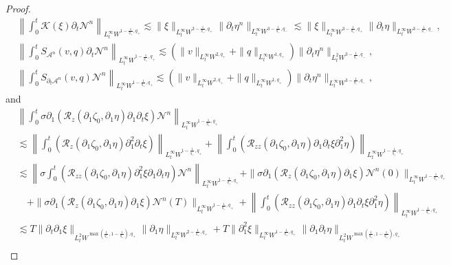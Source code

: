 \documentclass[letterpaper,reqno,10pt,twoside]{amsart}
\theoremstyle{definition}
\theoremstyle{remark}
\def\p{\partial}
\begin{document}
\begin{proof}
		\[
		\begin{aligned}
			& \left \|\int_{0}^{t}\mathcal{K}(\xi)\p_{t}\mathcal{N}^{n} \right\|_{L_{t}^{\infty}W^{1-\frac{1}{q_{+}},q_{+}}}\lesssim \|\xi\|_{L_{t}^{\infty}W^{3-\frac{1}{q_{+}},q_{+}}}\|\p_{t}\eta^{n}\|_{L_{t}^{\infty}W^{3-\frac{1}{q_{-}},q_{-}}}\lesssim \|\xi\|_{L_{t}^{\infty}W^{3-\frac{1}{q_{+}},q_{+}}}\|\p_{t}\eta\|_{L_{t}^{\infty}W^{3-\frac{1}{q_{-}},q_{-}}},\\
			& \left \|\int_{0}^{t}S_{\mathcal{A}^{n}}(v,q)\p_{t}\mathcal{N}^{n} \right\|_{L_{t}^{\infty}W^{1-\frac{1}{q_{+}},q_{+}}}\lesssim (\|v\|_{L_{t}^{\infty}W^{2,q_{+}}}+\|q\|_{L_{t}^{\infty}W^{1,q_{+}}})\|\p_{t}\eta^{n}\|_{L_{t}^{2}W^{3-\frac{1}{q_{-}},q_{-}}},\\
			& \left\|\int_{0}^{t}S_{\p_{t}\mathcal{A}^{n}}(v,q)\mathcal{N}^{n} \right\|_{L_{t}^{\infty}W^{1-\frac{1}{q_{+}},q_{+}}}\lesssim (\|v\|_{L_{t}^{\infty}W^{2,q_{+}}}+\|q\|_{L_{t}^{\infty}W^{1,q_{+}}})\|\p_{t}\eta^{n}\|_{L_{t}^{\infty}W^{3-\frac{1}{q_{-}},q_{-}}},
		\end{aligned}
		\]
		and
		\[
		\begin{aligned}
			&\left \|\int_{0}^{t}\sigma\p_{1}(\mathcal{R}_{z}(\p_{1}\zeta_{0},\p_{1}\eta)\p_{1}\p_{t}\xi)\mathcal{N}^{n}\right\|_{L_{t}^{\infty}W^{1-\frac{1}{q_{+}},q_{+}}}\\&\lesssim \left\|\int_{0}^{t}(\mathcal{R}_{z}(\p_{1}\zeta_{0},\p_{1}\eta)\p_{1}^{2}\p_{t}\xi) \right\|_{L_{t}^{\infty}W^{1-\frac{1}{q_{+}},q_{+}}}+\left\|\int_{0}^{t}(\mathcal{R}_{zz}(\p_{1}\zeta_{0},\p_{1}\eta)\p_{1}\p_{t}\xi\p_{1}^{2}\eta) \right\|_{L_{t}^{\infty}W^{1-\frac{1}{q_{+}},q_{+}}}\\&\lesssim \left\|\sigma\int_{0}^{t}(\mathcal{R}_{zz}(\p_{1}\zeta_{0},\p_{1}\eta)\p_{1}^{2}\xi\p_{1}\p_{t}\eta)\mathcal{N}^{n} \right\|_{L_{t}^{\infty}W^{1-\frac{1}{q_{+}},q_{+}}}+\|\sigma\p_{1}(\mathcal{R}_{z}(\p_{1}\zeta_{0},\p_{1}\eta)\p_{1}\xi)\mathcal{N}^{n}(0)\|_{L_{t}^{\infty}W^{1-\frac{1}{q_{+}},q_{+}}}\\
			&\quad+\|\sigma\p_{1}(\mathcal{R}_{z}(\p_{1}\zeta_{0},\p_{1}\eta)\p_{1}\xi)\mathcal{N}^{n}(T)\|_{L_{t}^{\infty}W^{1-\frac{1}{q_{+}},q_{+}}}+\left\|\int_{0}^{t}(\mathcal{R}_{zz}(\p_{1}\zeta_{0},\p_{1}\eta)\p_{1}\p_{t}\xi\p_{1}^{2}\eta)\right\|_{L_{t}^{\infty}W^{1-\frac{1}{q_{+}},q_{+}}}\\
			&\lesssim T\|\p_{t}\p_{1}\xi\|_{L_{t}^{2}W^{\max(\frac{1}{q_{+}},1-\frac{1}{q_{+}}),q_{+}}}\|\p_{1}\eta\|_{L_{t}^{\infty}W^{2-\frac{1}{q_{+}},q_{+}}}+T\|\p_{1}^{2}\xi\|_{L_{t}^{\infty}W^{1-\frac{1}{q_{+}},q_{+}}}\|\p_{1}\p_{t}\eta\|_{L_{t}^{2}W^{\max(\frac{1}{q_{+}},1-\frac{1}{q_{+}}),q_{+}}}\\

\end{aligned}\]
\end{proof}
\end{document}
